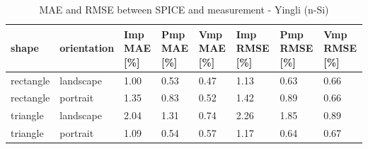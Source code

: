 \begin{table}[htbp]
\centering
\caption{MAE and RMSE between SPICE and measurement - Yingli (n-Si)}
\label{tab:mae_rmse_yingli}
\begin{tabular}{@{}llllllll@{}}
\toprule
shape & orientation & Imp MAE [\%] & Pmp MAE [\%] & Vmp MAE [\%] & Imp RMSE [\%] & Pmp RMSE [\%] & Vmp RMSE [\%] \\
\midrule
rectangle & landscape & 1.00 & 0.53 & 0.47 & 1.13 & 0.63 & 0.66 \\
rectangle & portrait & 1.35 & 0.83 & 0.52 & 1.42 & 0.89 & 0.66 \\
triangle & landscape & 2.04 & 1.31 & 0.74 & 2.26 & 1.85 & 0.89 \\
triangle & portrait & 1.09 & 0.54 & 0.57 & 1.17 & 0.64 & 0.67 \\
\bottomrule
\end{tabular}
\end{table}
